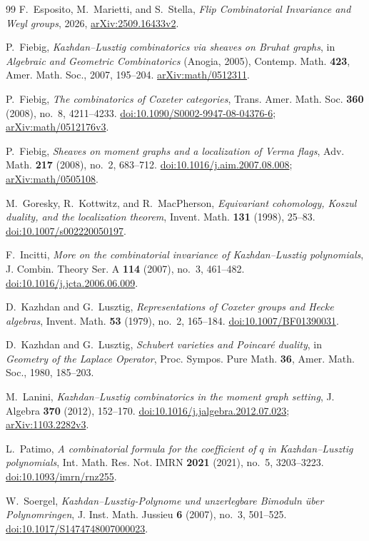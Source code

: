 \begin{thebibliography}{99}
F.~Esposito, M.~Marietti, and S.~Stella,
\emph{Flip Combinatorial Invariance and Weyl groups},
2026, \href{https://arxiv.org/abs/2509.16433v2}{arXiv:2509.16433v2}.

P.~Fiebig,
\emph{Kazhdan--Lusztig combinatorics via sheaves on Bruhat graphs},
in \emph{Algebraic and Geometric Combinatorics} (Anogia, 2005),
Contemp. Math. \textbf{423}, Amer. Math. Soc., 2007, 195--204.
\href{https://arxiv.org/abs/math/0512311}{arXiv:math/0512311}.

P.~Fiebig,
\emph{The combinatorics of Coxeter categories},
Trans. Amer. Math. Soc. \textbf{360} (2008), no.~8, 4211--4233.
\href{https://doi.org/10.1090/S0002-9947-08-04376-6}{doi:10.1090/S0002-9947-08-04376-6};
\href{https://arxiv.org/abs/math/0512176v3}{arXiv:math/0512176v3}.

P.~Fiebig,
\emph{Sheaves on moment graphs and a localization of Verma flags},
Adv. Math. \textbf{217} (2008), no.~2, 683--712.
\href{https://doi.org/10.1016/j.aim.2007.08.008}{doi:10.1016/j.aim.2007.08.008};
\href{https://arxiv.org/abs/math/0505108}{arXiv:math/0505108}.

M.~Goresky, R.~Kottwitz, and R.~MacPherson,
\emph{Equivariant cohomology, Koszul duality, and the localization theorem},
Invent. Math. \textbf{131} (1998), 25--83.
\href{https://doi.org/10.1007/s002220050197}{doi:10.1007/s002220050197}.

F.~Incitti,
\emph{More on the combinatorial invariance of Kazhdan--Lusztig polynomials},
J. Combin. Theory Ser. A \textbf{114} (2007), no.~3, 461--482.
\href{https://doi.org/10.1016/j.jcta.2006.06.009}{doi:10.1016/j.jcta.2006.06.009}.

D.~Kazhdan and G.~Lusztig,
\emph{Representations of Coxeter groups and Hecke algebras},
Invent. Math. \textbf{53} (1979), no.~2, 165--184.
\href{https://doi.org/10.1007/BF01390031}{doi:10.1007/BF01390031}.

D.~Kazhdan and G.~Lusztig,
\emph{Schubert varieties and Poincar\'e duality},
in \emph{Geometry of the Laplace Operator},
Proc. Sympos. Pure Math. \textbf{36}, Amer. Math. Soc., 1980, 185--203.

M.~Lanini,
\emph{Kazhdan--Lusztig combinatorics in the moment graph setting},
J. Algebra \textbf{370} (2012), 152--170.
\href{https://doi.org/10.1016/j.jalgebra.2012.07.023}{doi:10.1016/j.jalgebra.2012.07.023};
\href{https://arxiv.org/abs/1103.2282v3}{arXiv:1103.2282v3}.

L.~Patimo, \emph{A combinatorial formula for the coefficient of $q$ in Kazhdan--Lusztig polynomials},
Int. Math. Res. Not. IMRN \textbf{2021} (2021), no.~5, 3203--3223.
\href{https://doi.org/10.1093/imrn/rnz255}{doi:10.1093/imrn/rnz255}.

W.~Soergel,
\emph{Kazhdan--Lusztig-Polynome und unzerlegbare Bimoduln \"uber Polynomringen},
J. Inst. Math. Jussieu \textbf{6} (2007), no.~3, 501--525.
\href{https://doi.org/10.1017/S1474748007000023}{doi:10.1017/S1474748007000023}.

\end{thebibliography}
